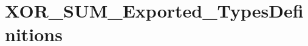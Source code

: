 \hypertarget{group___x_o_r___s_u_m___exported___types_definitions}{}\section{X\+O\+R\+\_\+\+S\+U\+M\+\_\+\+Exported\+\_\+\+Types\+Definitions}
\label{group___x_o_r___s_u_m___exported___types_definitions}
